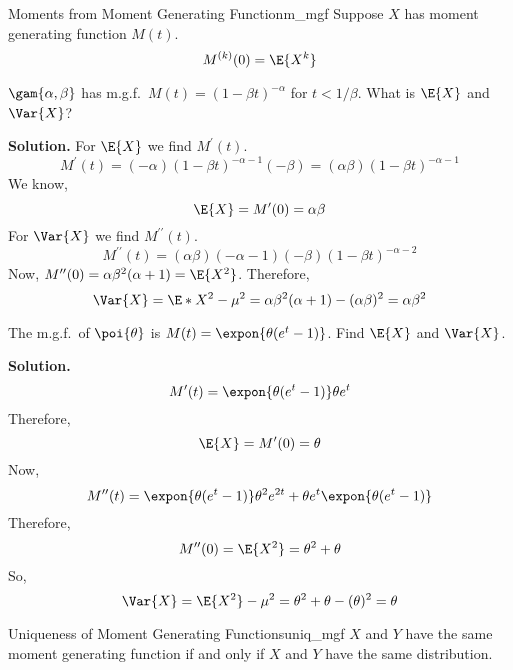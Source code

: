 \begin{Theorem}{Moments from Moment Generating Function}{m_mgf}
    Suppose $ X $ has moment generating function $ M(t) $.
    \[ M^{(k)}(0)=\E{X^k} \]
\end{Theorem}
\begin{Example}{}{}
    $ \gam{\alpha,\beta}$ has m.g.f.\
    $  M(t)=(1-\beta t)^{-\alpha} $
    for $ t<1/\beta $. What is $ \E{X} $ and $ \Var{X} $?

    \textbf{Solution.} For $ \E{X} $ we find $ M^\prime(t) $.
    \[ M^\prime(t)=(-\alpha)(1-\beta t)^{-\alpha-1}(-\beta)=
        (\alpha \beta)(1-\beta t)^{-\alpha-1} \]
    We know,
    \[ \E{X}=M^\prime(0)=\alpha\beta \]
    For $ \Var{X} $ we find $ M^{\prime\prime}(t) $.
    \[ M^{\prime\prime}(t)=(\alpha\beta)(-\alpha-1)(-\beta)(1-\beta t)^{-\alpha-2} \]
    Now, $ M^{\prime\prime}(0)=\alpha\beta^2(\alpha+1) =\E{X^2} $. Therefore,
    \[ \Var{X}=\E*{X^2}-\mu^2=\alpha\beta^2(\alpha+1)-(\alpha\beta)^2=\alpha\beta^2 \]
\end{Example}

\begin{Example}{}{}
    The m.g.f.\ of $ \poi{\theta} $ is $ M(t)=\expon{\theta(e^t-1)} $.
    Find $ \E{X} $ and $ \Var{X} $.

    \textbf{Solution.}
    \[ M^\prime(t)=\expon{\theta(e^t-1)}\theta e^t \]
    Therefore,
    \[ \E{X}=M^\prime(0)=\theta \]
    Now,
    \[ M^{\prime\prime}(t)=
        \expon{\theta(e^t-1)}\theta^2 e^{2t}+\theta e^t
        \expon{\theta(e^t-1)} \]
    Therefore,
    \[ M^{\prime\prime}(0)=\E{X^2}=\theta^2+\theta \]
    So,
    \[ \Var{X}=\E{X^2}-\mu^2=\theta^2+\theta-(\theta)^2=\theta \]
\end{Example}

\begin{Theorem}{Uniqueness of Moment Generating Functions}{uniq_mgf}
    $ X $ and $ Y $ have the same moment generating function if and only if
    $ X $ and $ Y $ have the same distribution.
\end{Theorem}

